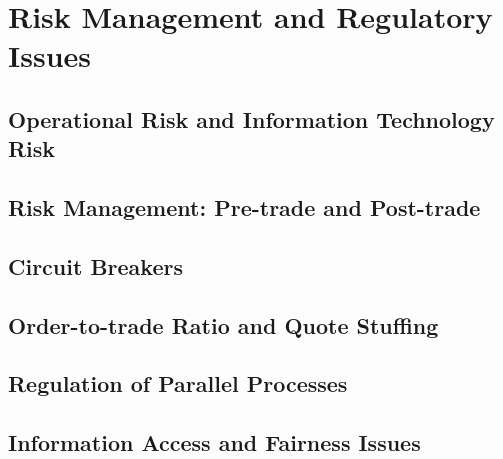 
\chapter{Risk Management and Regulatory Issues}

\section{Operational Risk and Information Technology Risk}
\section{Risk Management:  Pre-trade and Post-trade}
\section{Circuit Breakers}
\section{Order-to-trade Ratio and Quote Stuffing}
\section{Regulation of Parallel Processes}
\section{Information Access and Fairness Issues}